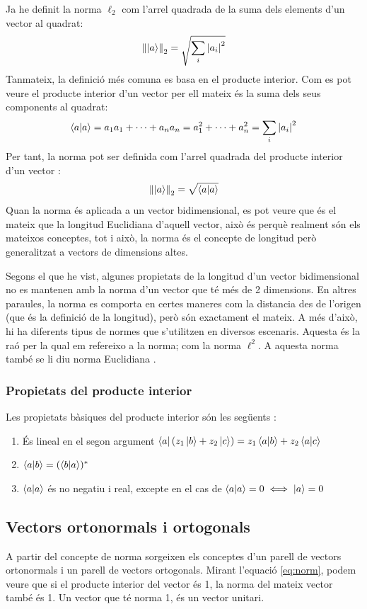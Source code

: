 Ja he definit la norma $\ell_2$ com l'arrel quadrada de la suma dels elements d'un vector al quadrat:
$$
\norm{\ket{a}}_2 = \sqrt{\sum_{i} \abs{a_{i}}^2}
$$
Tanmateix, la definició més comuna es basa en el producte interior. Com es pot veure el producte interior d'un vector per ell mateix és la suma dels seus components al quadrat:
$$
\bra{a}\ket{a} = a_1 a_1 + \cdots + a_n a_n = a_1^2 + \cdots +  a_n^2 \\= \sum_{i} \abs{a_i}^2
$$
Per tant, la norma pot ser definida com l'arrel quadrada del producte interior d'un vector \cite{LR_done_right:norm}:
\begin{equation}
\norm{\ket{a}}_2 = \sqrt{\bra{a}\ket{a}}
\label{eq:norm}
\end{equation}
Quan la norma és aplicada a un vector bidimensional, es pot veure que és el mateix que la longitud Euclidiana d'aquell vector, això és perquè realment són els mateixos conceptes, tot i això, la norma és el concepte de longitud però generalitzat a vectors de dimensions altes.

Segons el que he vist, algunes propietats de la longitud d'un vector bidimensional no es mantenen amb la norma d'un vector que té més de 2 dimensions. En altres paraules, la norma es comporta en certes maneres com la distancia des de l'origen (que és la definició de la longitud), però són exactament el mateix. A més d'això, hi ha diferents tipus de normes que s'utilitzen en diversos escenaris. Aquesta és la raó per la qual em refereixo a la norma; com la norma $\ell^2$. A aquesta norma també se li diu norma Euclidiana \cite{wolfram:2norm}.

\subsubsection{Propietats del producte interior}
Les propietats bàsiques del producte interior són les següents \cite{QCandQI:intro}:
\begin{enumerate}
	\item És lineal en el segon argument $\bra{a}(z_{1}\ket{b}+z_{2}\ket{c}) = z_{1}\bra{a}\ket{b} + z_{2}\bra{a}\ket{c}$
	\item $\bra{a}\ket{b} = (\bra{b}\ket{a})^*$
	\item $\bra{a}\ket{a}$ és no negatiu i real, excepte en el cas de $\bra{a}\ket{a} = 0 \iff \ket{a} = 0$
\end{enumerate}

 
\subsection{Vectors ortonormals i ortogonals}
A partir del concepte de norma sorgeixen els conceptes d'un parell de vectors ortonormals i un parell de vectors ortogonals.
Mirant l'equació \eqref{eq:norm}, podem veure que si el producte interior del vector és 1, la norma del mateix vector també és 1. Un vector que té norma 1, és un vector unitari.

